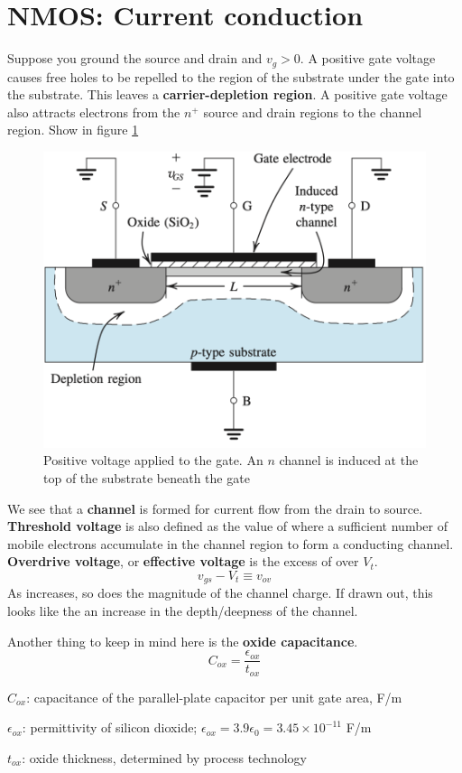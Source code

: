 \section{NMOS: Current conduction}
Suppose you ground the source and drain and $v_g > 0$. A positive gate voltage causes free holes to be repelled to the region of the substrate under the gate into the substrate. This leaves a \textbf{carrier-depletion region}. A positive gate voltage also attracts electrons from the $n^+$ source and drain regions to the channel region. Show in figure \ref{fig:nmos_conduct}
\begin{figure}[H]
    \centering
    \includegraphics[scale=0.4]{figs/ch05/nmos_conduct}
    \caption{Positive voltage applied to the gate. An $n$ channel is induced at the top of the substrate beneath the gate}
    \label{fig:nmos_conduct}
\end{figure}
We see that a \textbf{channel} is formed for current flow from the drain to source. \textbf{Threshold voltage} is also defined as the value of \vgs where a sufficient number of mobile electrons accumulate in the channel region to form a conducting channel. \textbf{Overdrive voltage}, or \textbf{effective voltage} is the excess of \vgs over $V_t$. 
    \[v_{gs} - V_t \equiv v_{ov}\]
As \vov increases, so does the magnitude of the channel charge. If drawn out, this looks like the an increase in the depth/deepness of the channel.

Another thing to keep in mind here is the \textbf{oxide capacitance}.
    \[C_{ox} = \frac{\epsilon_{ox}}{t_{ox}}\]
\begin{gline}
    \item $C_{ox}$: capacitance of the parallel-plate capacitor per unit gate area, F/m\sq
    \item $\epsilon_{ox}$: permittivity of silicon dioxide; $\epsilon_{ox} = 3.9 \epsilon_0 = 3.45 \times 10^{-11}$ F/m
    \item $t_{ox}$: oxide thickness, determined by process technology
\end{gline}

